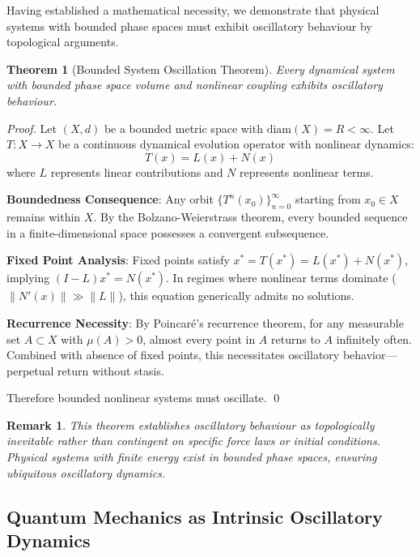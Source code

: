 \documentclass[12pt,a4paper]{article}
\newtheorem{theorem}{Theorem}
\newtheorem{remark}{Remark}
\begin{document}
Having established a mathematical necessity, we demonstrate that physical systems with bounded phase spaces must exhibit oscillatory behaviour by topological arguments.

\begin{theorem}[Bounded System Oscillation Theorem]
\label{thm:bounded_oscillation}
Every dynamical system with bounded phase space volume and nonlinear coupling exhibits oscillatory behaviour.
\end{theorem}

\begin{proof}
Let $(X, d)$ be a bounded metric space with $\text{diam}(X) = R < \infty$. Let $T: X \to X$ be a continuous dynamical evolution operator with nonlinear dynamics:
$$T(x) = L(x) + N(x)$$
where $L$ represents linear contributions and $N$ represents nonlinear terms.

\textbf{Boundedness Consequence}: Any orbit $\{T^n(x_0)\}_{n=0}^{\infty}$ starting from $x_0 \in X$ remains within $X$. By the Bolzano-Weierstrass theorem, every bounded sequence in a finite-dimensional space possesses a convergent subsequence.

\textbf{Fixed Point Analysis}: Fixed points satisfy $x^* = T(x^*) = L(x^*) + N(x^*)$, implying $(I - L)x^* = N(x^*)$. In regimes where nonlinear terms dominate ($\|N'(x)\| \gg \|L\|$), this equation generically admits no solutions.

\textbf{Recurrence Necessity}: By Poincaré's recurrence theorem, for any measurable set $A \subset X$ with $\mu(A) > 0$, almost every point in $A$ returns to $A$ infinitely often. Combined with absence of fixed points, this necessitates oscillatory behavior—perpetual return without stasis.

Therefore bounded nonlinear systems must oscillate. \qed
\end{proof}

\begin{remark}
This theorem establishes oscillatory behaviour as topologically inevitable rather than contingent on specific force laws or initial conditions. Physical systems with finite energy exist in bounded phase spaces, ensuring ubiquitous oscillatory dynamics.
\end{remark}

\subsection{Quantum Mechanics as Intrinsic Oscillatory Dynamics}
\end{document}
